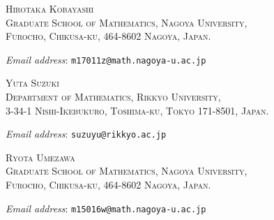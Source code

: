 \documentclass{amsart}
\theoremstyle{plain}
\theoremstyle{definition}
\begin{document}
\begin{flushleft}
{\textsc{%
\small
Hirotaka Kobayashi\\[.3em]
\footnotesize
Graduate School of Mathematics, Nagoya University,\\
Furocho, Chikusa-ku, 464-8602 Nagoya, Japan.
}

\small
\textit{Email address}: \texttt{m17011z@math.nagoya-u.ac.jp}
}
\bigskip

{\textsc{%
\small
Yuta Suzuki\\[.3em]
\footnotesize
Department of Mathematics, Rikkyo University,\\
3-34-1 Nishi-Ikebukuro, Toshima-ku, Tokyo 171-8501, Japan.
}

\small
\textit{Email address}: \texttt{suzuyu@rikkyo.ac.jp}
}
\bigskip

{\textsc{%
\small
Ryota Umezawa\\[.3em]
\footnotesize
Graduate School of Mathematics, Nagoya University,\\
Furocho, Chikusa-ku, 464-8602 Nagoya, Japan.
}

\small
\textit{Email address}: \texttt{m15016w@math.nagoya-u.ac.jp}
}
\end{flushleft}
\end{document}
